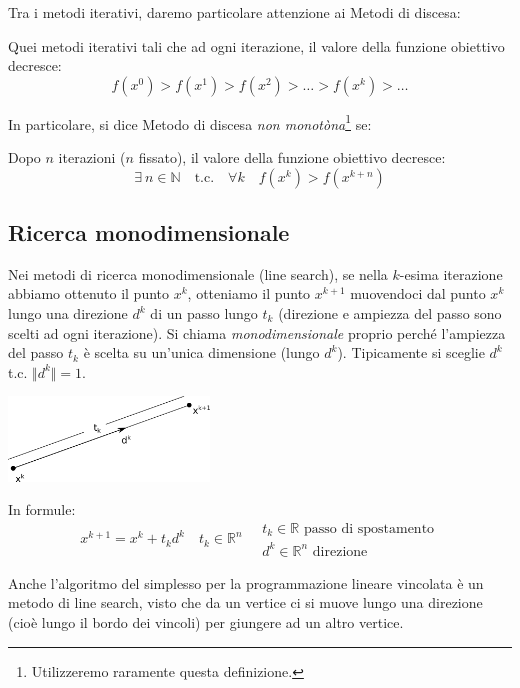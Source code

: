 Tra i metodi iterativi, daremo particolare attenzione ai Metodi di
discesa:
\begin{defn} Quei metodi iterativi tali che ad ogni
iterazione, il valore della funzione obiettivo decresce: $$ f(x^0) >
f(x^1) > f(x^2) > \ldots > f(x^k) > \ldots $$
\end{defn}

In particolare, si dice Metodo di discesa \emph{non
monotòna}\footnote{Utilizzeremo raramente questa definizione.} se:
\begin{defn} Dopo $n$ iterazioni ($n$
fissato), il valore della funzione obiettivo decresce:
$$ \exists ~ n \in \mathbb{N} \quad \text{t.c.} \quad \forall k \quad f(x^k) > f(x^{k+n}) $$
\end{defn}

\subsection{Ricerca monodimensionale} Nei metodi di ricerca
monodimensionale (line search), se nella $k$-esima iterazione abbiamo
ottenuto il punto $x^k$, otteniamo il punto $x^{k+1}$ muovendoci dal
punto $x^k$ lungo una direzione $d^k$ di un passo lungo $t_k$
(direzione e ampiezza del passo sono scelti ad ogni iterazione). Si
chiama \emph{monodimensionale} proprio perch\'e l'ampiezza del passo
$t_k$ \`e scelta su un'unica dimensione (lungo $d^k$). Tipicamente si
sceglie $d^k$ t.c. $\Vert d^k \Vert = 1$.

\centerline{\includegraphics[width=0.40\textwidth]{imgs/ricerca-monodimensionale-passo.png}}

In formule:
$$ x^{k+1} = x^{k} + t_k d^{k} \quad t_k \in \mathbb{R}^{n} \quad
  \begin{array}{l} t_k \in \mathbb{R}\text{ passo di spostamento} \\
d^{k} \in \mathbb{R}^n \text{ direzione}
  \end{array}
$$

\begin{notes} Anche l'algoritmo del simplesso per la programmazione
lineare vincolata \`e un metodo di line search, visto che da un vertice
ci si muove lungo una direzione (cio\`e lungo il bordo dei vincoli) per
giungere ad un altro vertice.
\end{notes}

